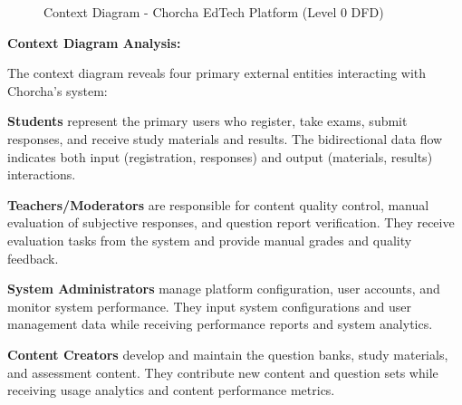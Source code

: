 \documentclass[12pt,a4paper,oneside]{book}
\begin{document}
\begin{figure}[H]
{
    }%
    \caption{Context Diagram - Chorcha EdTech Platform (Level 0 DFD)}
\end{figure}

\textbf{Context Diagram Analysis:}

The context diagram reveals four primary external entities interacting with Chorcha's system:

\textbf{Students} represent the primary users who register, take exams, submit responses, and receive study materials and results. The bidirectional data flow indicates both input (registration, responses) and output (materials, results) interactions.

\vspace{0.3cm}
\textbf{Teachers/Moderators} are responsible for content quality control, manual evaluation of subjective responses, and question report verification. They receive evaluation tasks from the system and provide manual grades and quality feedback.

\vspace{0.3cm}
\textbf{System Administrators} manage platform configuration, user accounts, and monitor system performance. They input system configurations and user management data while receiving performance reports and system analytics.

\vspace{0.3cm}
\textbf{Content Creators} develop and maintain the question banks, study materials, and assessment content. They contribute new content and question sets while receiving usage analytics and content performance metrics.
\end{document}
